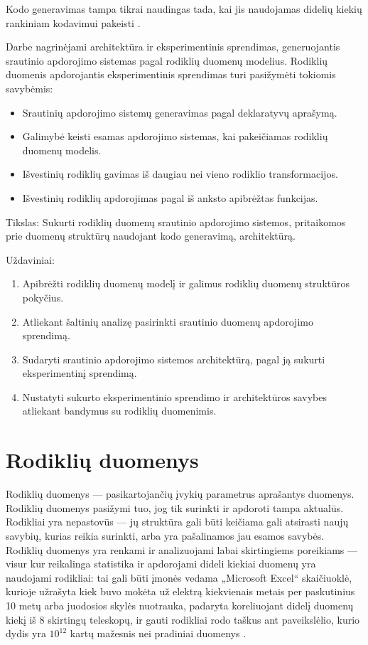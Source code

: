 \documentclass{VUMIFPSbakalaurinis}
\begin{document}
Kodo generavimas tampa tikrai naudingas tada, kai jis naudojamas didelių kiekių rankiniam kodavimui pakeisti \cite{herrington2003code}. \par
Darbe nagrinėjami architektūra ir eksperimentinis sprendimas, generuojantis srautinio apdorojimo sistemas pagal rodiklių duomenų modelius. Rodiklių duomenis apdorojantis eksperimentinis sprendimas turi pasižymėti tokiomis savybėmis: 
\begin{itemize}
    \item Srautinių apdorojimo sistemų generavimas pagal deklaratyvų aprašymą.
    \item Galimybė keisti esamas apdorojimo sistemas, kai pakeičiamas rodiklių duomenų modelis.
    \item Išvestinių rodiklių gavimas iš daugiau nei vieno rodiklio transformacijos.
    \item Išvestinių rodiklių apdorojimas pagal iš anksto apibrėžtas funkcijas.
\end{itemize}  

Tikslas: Sukurti rodiklių duomenų srautinio apdorojimo sistemos, pritaikomos prie duomenų struktūrų naudojant kodo generavimą, architektūrą.

Uždaviniai:
\begin{enumerate}
    \item Apibrėžti rodiklių duomenų modelį ir galimus rodiklių duomenų struktūros pokyčius.
    \item Atliekant šaltinių analizę pasirinkti srautinio duomenų apdorojimo sprendimą.
    \item Sudaryti srautinio apdorojimo sistemos architektūrą, pagal ją sukurti eksperimentinį sprendimą. 
    \item Nustatyti sukurto eksperimentinio sprendimo ir architektūros savybes atliekant bandymus su rodiklių duomenimis.
\end{enumerate}

\section{Rodiklių duomenys}

Rodiklių duomenys — pasikartojančių įvykių parametrus aprašantys duomenys. Rodiklių duomenys pasižymi tuo, jog tik surinkti ir apdoroti tampa aktualūs. Rodikliai yra nepastovūs — jų struktūra gali būti keičiama gali atsirasti naujų savybių, kurias reikia surinkti, arba yra pašalinamos jau esamos savybės. Rodiklių duomenys yra renkami ir analizuojami labai skirtingiems poreikiams — visur kur reikalinga statistika ir apdorojami dideli kiekiai duomenų yra naudojami rodikliai: tai gali būti įmonės vedama „Microsoft Excel“ skaičiuoklė, kurioje užrašyta kiek buvo mokėta už elektrą kiekvienais metais per paskutinius 10 metų arba juodosios skylės nuotrauka, padaryta koreliuojant didelį duomenų kiekį iš 8 skirtingų teleskopų, ir gauti rodikliai rodo taškus ant paveikslėlio, kurio dydis yra \(10^{12}\) kartų mažesnis nei pradiniai duomenys \cite{akiyama2019first}.
\end{document}
